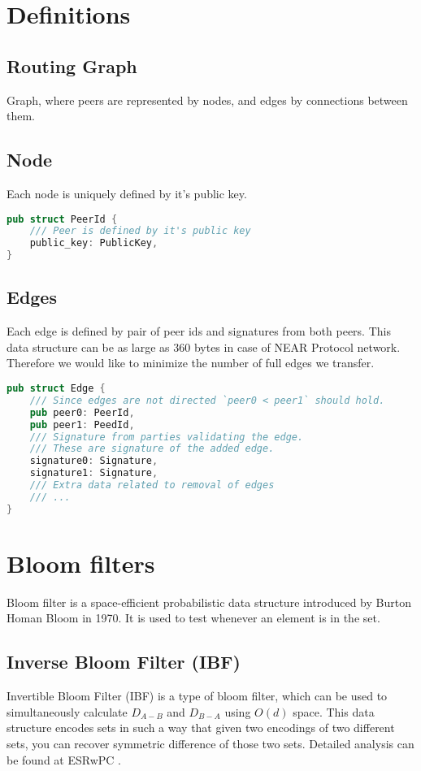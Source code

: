 \documentclass[11pt]{article}
\begin{document}
\section{Definitions}
\subsection{Routing Graph}
Graph, where peers are represented by nodes, and edges by connections between them.
\subsection{Node}
Each node is uniquely defined by it's public key.
\begin{lstlisting}[language=Rust]
pub struct PeerId {
    /// Peer is defined by it's public key
    public_key: PublicKey,
}
\end{lstlisting}
\subsection{Edges}
Each edge is defined by pair of peer ids and signatures from both peers.
This data structure can be as large as 360 bytes in case of NEAR Protocol network.
Therefore we would like to minimize the number of full edges we transfer.
\begin{lstlisting}[language=Rust]
pub struct Edge {
    /// Since edges are not directed `peer0 < peer1` should hold.
    pub peer0: PeerId,
    pub peer1: PeedId,
    /// Signature from parties validating the edge.
    /// These are signature of the added edge.
    signature0: Signature,
    signature1: Signature,
    /// Extra data related to removal of edges
    /// ...
}
\end{lstlisting}

\section{Bloom filters}
Bloom filter is a space-efficient probabilistic data structure introduced by Burton Homan Bloom \cite{bhb} in 1970.
It is used to test whenever an element is in the set.
\subsection{Inverse Bloom Filter (IBF)}
Invertible Bloom Filter (IBF) is a type of bloom filter, which can be used to simultaneously calculate  $D_{A-B}$ and $D_{B-A}$ using $O(d)$ space.
This data structure encodes sets in such a way that given two encodings  of two different sets, you can recover symmetric difference of those two sets.
Detailed analysis can be found at ESRwPC \cite{esrwpc}.
\end{document}
